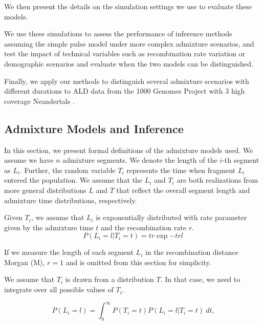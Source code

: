 \documentclass[]{article}
\begin{document}
We then present the details on the simulation settings we use to evaluate these models.

We use these simulations to assess the performance of inference methods assuming the simple pulse model under more complex admixture scenarios, and test the impact of technical variables such as recombination rate variation or demographic scenarios and evaluate when the two models can be distinguished.

Finally, we apply our methods to distinguish several admixture scenarios with different durations to ALD data from the 1000 Genomes Project \citep{the_1000_genomes_project_consortium_global_2015} with 3 high coverage Neandertals \citep{prufer_complete_2013,prufer_high-coverage_2017,mafessoni_high_coverage_2020}.


\subsection{Admixture Models and Inference}\label{admixture models}

In this section, we present formal definitions of the admixture models used.  We assume we have $n$ admixture segments. We denote the length of the $i$-th segment as $L_i$. Further, the random variable $T_i$ represents the time when fragment $L_i$ entered the population. We assume that the $L_i$ and $T_i$ are both realizations from more general distributions $L$ and $T$ that reflect the overall segment length and admixture time distributions, respectively. 

Given $T_i$, we assume that $L_i$ is exponentially distributed with rate parameter given by the admixture time $t$ and the recombination rate $r$.
\begin{equation}
\label{eq:generall_length_distribution}
    P(L_i=l|T_i=t) = t r\exp{-t r l} 
\end{equation}

If we measure the length of each segment $L_i$ in the recombination distance Morgan (M), $r=1$ and is omitted from this section for simplicity.

We assume that  $T_i$ is drawn from a distribution $T$. In that case, we need to integrate over all possible values of $T_i$. 

\begin{equation}
\label{eq:standard_likelihood_definintion}
    P(L_i=l)=\int_{0}^{\infty} P(T_i=t) P(L_i=l | T_i=t) \ dt \text{,}
\end{equation}
\end{document}
